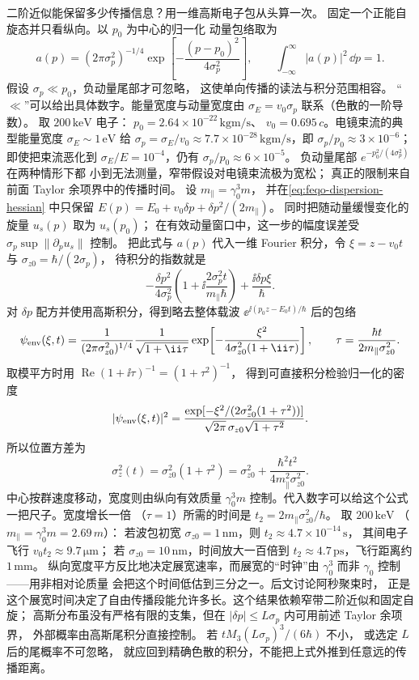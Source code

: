二阶近似能保留多少传播信息？用一维高斯电子包从头算一次。
固定一个正能自旋态并只看纵向。以 \(p_0\) 为中心的归一化
动量包络取为
\[
a(p)=(2\pi\sigma_p^2)^{-1/4}
\exp\!\left[-\frac{(p-p_0)^2}{4\sigma_p^2}\right],
\qquad \int_{-\infty}^{\infty}|a(p)|^2\,\dd p=1.
\]
假设 \(\sigma_p\ll p_0\)，负动量尾部才可忽略，
这使单向传播的读法与积分范围相容。
“\(\ll\)”可以给出具体数字。能量宽度与动量宽度由
\(\sigma_E=v_0\sigma_p\) 联系（色散的一阶导数）。
取 \(200\,\si{\kilo\electronvolt}\) 电子：
\(p_0=2.64\times10^{-22}\,\si{\kilo\gram\metre\per\second}\)、
\(v_0=0.695\,c\)。电镜束流的典型能量宽度
\(\sigma_E\sim1\,\si{\electronvolt}\) 给
\(\sigma_p=\sigma_E/v_0\approx7.7\times10^{-28}\,
\si{\kilo\gram\metre\per\second}\)，即
\(\sigma_p/p_0\approx3\times10^{-6}\)；
即使把束流恶化到 \(\sigma_E/E=10^{-4}\)，仍有
\(\sigma_p/p_0\approx6\times10^{-5}\)。
负动量尾部 \(e^{-p_0^2/(4\sigma_p^2)}\) 在两种情形下都
小到无法测量，窄带假设对电镜束流极为宽松；
真正的限制来自前面 Taylor 余项界中的传播时间。
设 \(m_\parallel=\gamma_0^3m\)，
并在\cref{eq:feqo-dispersion-hessian} 中只保留
\(E(p)=E_0+v_0\delta p+\delta p^2/(2m_\parallel)\)。
同时把随动量缓慢变化的旋量 \(u_s(p)\) 取为 \(u_s(p_0)\)；
在有效动量窗口中，这一步的幅度误差受
\(\sigma_p\sup\|\partial_pu_s\|\) 控制。
把此式与 \(a(p)\) 代入一维 Fourier 积分，令
\(\xi=z-v_0t\) 与 \(\sigma_{z0}=\hbar/(2\sigma_p)\)，
待积分的指数就是
\[
-\frac{\delta p^2}{4\sigma_p^2}
\left(1+\ii\frac{2\sigma_p^2t}{m_\parallel\hbar}\right)
+\frac{\ii\delta p\xi}{\hbar}.
\]
对 \(\delta p\) 配方并使用高斯积分，得到略去整体载波
\(\ee^{\ii(p_0z-E_0t)/\hbar}\) 后的包络
\[
\psi_{\rm env}(\xi,t)
=\frac{1}{(2\pi\sigma_{z0}^2)^{1/4}}
\frac{1}{\sqrt{1+\ii\tau}}
\exp\!\left[-\frac{\xi^2}{4\sigma_{z0}^2(1+\ii\tau)}\right],
\qquad
\tau=\frac{\hbar t}{2m_\parallel\sigma_{z0}^2}.
\]
取模平方时用
\(\operatorname{Re}(1+\ii\tau)^{-1}=(1+\tau^2)^{-1}\)，
得到可直接积分检验归一化的密度
\[
|\psi_{\rm env}(\xi,t)|^2
=\frac{\exp[-\xi^2/(2\sigma_{z0}^2(1+\tau^2))]}
{\sqrt{2\pi}\,\sigma_{z0}\sqrt{1+\tau^2}}.
\]
所以位置方差为
\[
\sigma_z^2(t)=\sigma_{z0}^2(1+\tau^2)
=\sigma_{z0}^2+
\frac{\hbar^2t^2}{4m_\parallel^2\sigma_{z0}^2}.
\]
中心按群速度移动，宽度则由纵向有效质量 \(\gamma_0^3m\)
控制。代入数字可以给这个公式一把尺子。宽度增长一倍
（\(\tau=1\)）所需的时间是
\(t_2=2m_\parallel\sigma_{z0}^2/\hbar\)。
取 \(200\,\si{\kilo\electronvolt}\)
（\(m_\parallel=\gamma_0^3m=2.69\,m\)）：
若波包初宽 \(\sigma_{z0}=1\,\si{\nano\metre}\)，则
\(t_2\approx4.7\times10^{-14}\,\si{\second}\)，
其间电子飞行 \(v_0t_2\approx9.7\,\si{\micro\metre}\)；
若 \(\sigma_{z0}=10\,\si{\nano\metre}\)，时间放大一百倍到
\(t_2\approx4.7\,\si{\pico\second}\)，飞行距离约
\(1\,\si{\milli\metre}\)。
纵向宽度平方反比地决定展宽速率，而展宽的“时钟”由
\(\gamma_0^3\) 而非 \(\gamma_0\) 控制——用非相对论质量
会把这个时间低估到三分之一。后文讨论阿秒聚束时，
正是这个展宽时间决定了自由传播段能允许多长。这个结果依赖窄带二阶近似和固定自旋；
高斯分布虽没有严格有限的支集，但在
\(|\delta p|\le L\sigma_p\) 内可用前述 Taylor 余项界，
外部概率由高斯尾积分直接控制。
若 \(tM_3(L\sigma_p)^3/(6\hbar)\) 不小，
或选定 \(L\) 后的尾概率不可忽略，
就应回到精确色散的积分，不能把上式外推到任意远的传播距离。

